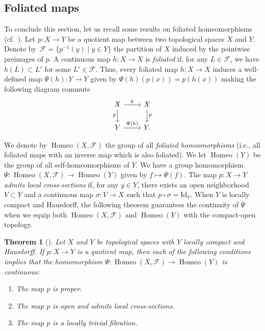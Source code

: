 \documentclass[pdftex]{sigma}
\numberwithin{equation}{section}
\newtheorem{thm}{Theorem}[section]
\theoremstyle{definition}
\DeclareMathOperator{\Home}{\mathrm{Homeo}}
\newcommand{\Id}{\mathrm{Id}}
\newcommand{\fol}{\mathcal{F}}
\begin{document}
	
\subsection{Foliated maps}
\label{s:foliated.maps}
To conclude this section, let us recall some results on foliated homeomorphisms (cf.\ \cite[Section~3]{MaysmenkoPolulyakh}). Let $p\colon X\to Y$ be a quotient map between two topological spaces $X$ and $Y$. Denote by~${\fol = \big\{p^{-1}(y)\mid y\in Y\big\}}$ the partition of $X$ induced by the pointwise preimages of $p$.
A continuous map $h\colon X\to X$ is \emph{foliated} if, for any $L\in \fol$, we have $h(L)\subset L'$ for some $L'\in \fol$.
Thus, every foliated map $h\colon X\to X$ induces a well-defined map $\Psi(h)\colon Y\to Y$
 given by $\Psi(h)(p(x)) = p(h(x))$
making the following diagram commute
\[
	\begin{tikzcd}
	X \arrow[d, "p", labels = left] \arrow[r,"h"]& X \arrow[d,"p"]\\
	Y \arrow[r,"\Psi(h)"] & Y.
	\end{tikzcd}
\]

We denote by $\Home(X,\fol)$ the group of all \emph{foliated homeomorphisms} (i.e., all foliated maps with an inverse map which is also foliated). We let $\Home(Y)$ be the group of all self-homeomorphisms of $Y$. We have a group homomorphism $\Psi\colon \Home(X,\fol)\to \Home(Y)$ given by $f\mapsto \Psi(f)$. The map $p\colon X\to Y$ \emph{admits local cross-sections} if, for any $y\in Y$, there exists an open neighborhood $V\subset Y$ and a continuous map $\sigma\colon V\to X$ such that $p\circ \sigma = \Id_{V}$.
When $Y$ is locally compact and Hausdorff, the following theorem guarantees the continuity of $\Psi$ when we equip both $\Home(X,\fol)$ and $\Home(Y)$ with the compact-open topology.
	
\begin{thm}[]\label{T: Continuity of psi}
Let $X$ and $Y$ be topological spaces with $Y$ locally compact and Hausdorff. If $p\colon X \to Y$ is a quotient map, then each of the following conditions implies that the homomorphism $\Psi\colon \Home(X,\fol)\to \Home(Y)$ is continuous:
		\begin{enumerate}\itemsep=0pt
		 \item[$(1)$] The map $p$ is proper.
		 \item[$(2)$] The map $p$ is open and admits local cross-sections.
		 \item[$(3)$] The map $p$ is a locally trivial fibration.
		\end{enumerate}
	\end{thm}
	
\end{document}
